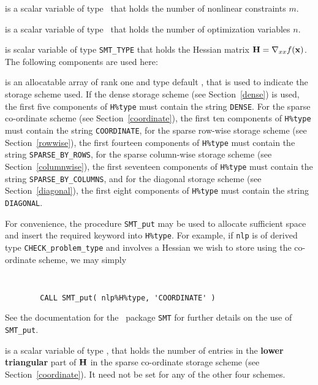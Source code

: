 \documentclass{galahad}
\newcommand{\packagename}{CHECK}
\begin{document}
\begin{description}

 is a scalar variable of type \integer\ 
 that holds the number of nonlinear constraints $m$.  

 is a scalar variable of type \integer\ 
 that holds the number of optimization variables $n$.  
              
\ittf{H} is scalar variable of type {\tt SMT\_TYPE} 
that holds the Hessian matrix ${\mathbf{H}}=\nabla_{xx}f({\mathbf{x}})$. The following components
are used here:

\begin{description}

 is an allocatable array of rank one and type default 
\character, that
is used to indicate the storage scheme used. If the dense storage scheme 
(see Section~\ref{dense}) is used, 
the first five components of {\tt H\%type} must contain the
string {\tt DENSE}.
For the sparse co-ordinate scheme (see Section~\ref{coordinate}), 
the first ten components of {\tt H\%type} must contain the
string {\tt COORDINATE},  
for the sparse row-wise storage scheme (see Section~\ref{rowwise}),
the first fourteen components of {\tt H\%type} must contain the
string {\tt SPARSE\_BY\_ROWS},
for the sparse column-wise storage scheme (see Section~\ref{columnwise}),
the first seventeen components of {\tt H\%type} must contain the
string {\tt SPARSE\_BY\_COLUMNS},
and for the diagonal storage scheme (see Section~\ref{diagonal}),
the first eight components of {\tt H\%type} must contain the
string {\tt DIAGONAL}.

For convenience, the procedure {\tt SMT\_put} 
may be used to allocate sufficient space and insert the required keyword
into {\tt H\%type}.
For example, if {\tt nlp} is of derived type {\tt \packagename\_problem\_type}
and involves a Hessian we wish to store using the co-ordinate scheme,
we may simply
{\tt 
\begin{verbatim}
        CALL SMT_put( nlp%H%type, 'COORDINATE' )
\end{verbatim}
}
\noindent
See the documentation for the \galahad\ package {\tt SMT} 
for further details on the use of {\tt SMT\_put}.

 is a scalar variable of type \integer, that 
holds the number of entries in the {\bf lower triangular} part of ${\mathbf{H}}$
in the sparse co-ordinate storage scheme (see Section~\ref{coordinate}). 
It need not be set for any of the other four schemes.


\end{description}
\end{description}
\end{document}
